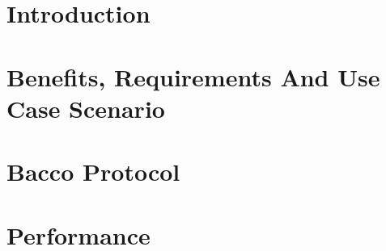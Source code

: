 \restoregeometry


\thispagestyle{empty} %
\cleardoublepage

\thispagestyle{empty}

\clearpage{\pagestyle{plain}\cleardoublepage}


\printunsrtglossary[type=main]

\clearpage{\pagestyle{plain}\cleardoublepage}
\tableofcontents

\clearpage{\pagestyle{plain}\cleardoublepage}

\chapter*{Introduction}
\label{chapter:introduction}
 


\chapter{Benefits, Requirements And Use Case Scenario}
\label{chapter:cap1}


%

%

\chapter{Bacco Protocol}
\label{chapter:protocol}



\chapter{Performance}
\label{chapter:performance}


%

